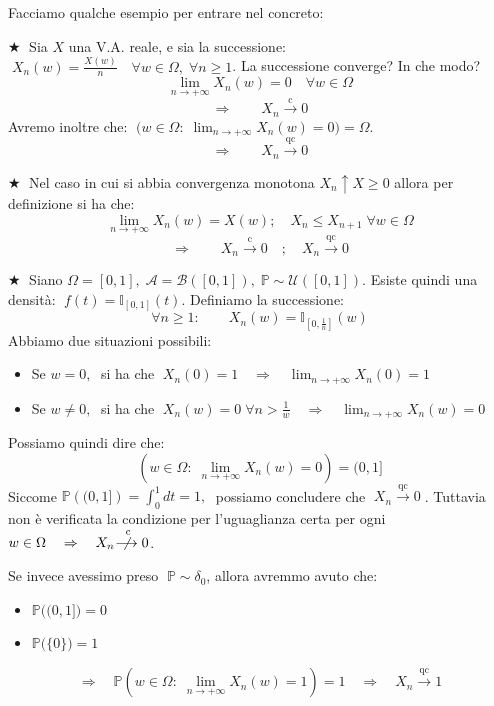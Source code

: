 \begin{esempio}
    Facciamo qualche esempio per entrare nel concreto:
    
    \bigskip
    \noindent \(\bigstar \;\) Sia $X$ una V.A. reale, e sia la successione: $\;X_n(w) = \frac{X(w)}{n} \quad \forall w\in \Omega,\;\forall n\geq1$. La successione converge? In che modo?
    \[\lim_{n \to+\infty }X_n(w) = 0\quad \forall w\in \Omega\]
    \[\Rightarrow\qquad X_n \overset{\text{c}}{\longrightarrow}0\]
    Avremo inoltre che: $\;\bigl(w\in\Omega:\;\lim_{n \to+\infty }X_n(w) = 0\bigr) = \Omega$.
        \[\Rightarrow\qquad X_n \overset{\text{qc}}{\longrightarrow}0\]

    \bigskip
    \noindent \(\bigstar \;\) Nel caso in cui si abbia convergenza monotona $X_n\uparrow X\geq0$ allora per definizione si ha che:
    \[\lim_{n\to+\infty} X_n(w) = X(w);\quad X_n\leq X_{n+1}\; \forall w\in\Omega\]
    \[\Rightarrow\qquad X_n \overset{\text{c}}{\longrightarrow}0\quad ;\quad X_n \overset{\text{qc}}{\longrightarrow}0\]

    \bigskip
    \noindent \(\bigstar \;\) Siano $\Omega = [0, 1], \;\mathcal{A} =\mathcal{B}([0, 1]), \;\mathbb P\sim \mathcal{U}([0, 1])$. Esiste quindi una densità: $\;f(t) = \mathbb{I}_{[0, 1]}(t).$ Definiamo la successione:
    \[\forall n\geq 1:\qquad X_n(w) = \mathbb{I}_{[0, \frac{1}{n}]}(w)\]
    Abbiamo due situazioni possibili:
    \begin{itemize}
        \item Se $w=0,\;$ si ha che $\;X_n(0) = 1\quad \Rightarrow\quad \lim_{n\to+\infty} X_n(0) = 1$
        \item Se $w\neq 0,\;$ si ha che $\;X_n(w) = 0 \;\forall n >\frac{1}{w}\quad \Rightarrow\quad \lim_{n\to+\infty}X_n(w) = 0$
    \end{itemize}
    Possiamo quindi dire che:
    \[\left(w\in\Omega:\;\lim_{n\to+\infty} X_n (w) = 0\right) = (0, 1]\]
    Siccome $\mathbb{P}\left((0, 1]\right) = \int_0^1 dt = 1, \;$ possiamo concludere che $\;X_n \overset{\text{qc}}{\longrightarrow}0\;$. Tuttavia non è verificata la condizione per l'uguaglianza certa per ogni $w\in\Omega\quad \Rightarrow \quad X_n \overset{\text{c}}{\;\not\!\!\!\longrightarrow}0$.

    \bigskip
    \noindent Se invece avessimo preso $\;\mathbb{P} \sim \delta_0$, allora avremmo avuto che:
    \begin{itemize}
        \item $\mathbb{P}\bigl((0, 1]\bigr) = 0$
        \item $\mathbb{P}\bigl(\{0\}\bigr) = 1$
    \end{itemize}
    \[\Rightarrow\quad \mathbb P\left(w\in\Omega:\;\lim_{n\to+\infty}X_n(w) = 1\right) = 1\quad \Rightarrow\quad X_n \overset{\text{qc}}{\longrightarrow}1\]
    
\end{esempio}

